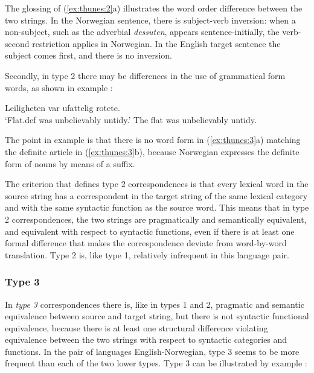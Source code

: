 \documentclass[output=paper]{LSP/langsci}
\begin{document}
The glossing of (\ref{ex:thunes:2}a) illustrates the word order difference between the two strings. In the Norwegian sentence, there is subject-verb inversion: when a non-subject, such as the adverbial \textit{dessuten}, appears sentence-initially, the verb-second restriction applies in Norwegian. In the English target sentence the subject comes first, and there is no inversion.

\begin{styleTCiiiTextBodyFirstLineIndent}
Secondly, in type 2 there may be differences in the use of grammatical form words, as shown in example :
\end{styleTCiiiTextBodyFirstLineIndent}

\ea \label{ex:thunes:3}
     \ea
Leiligheten var ufattelig rotete.\\
`Flat.def was unbelievably untidy.'  
      \ex 
The flat was unbelievably untidy.
      \z
\z

The point in example  is that there is no word form in (\ref{ex:thunes:3}a) matching the definite article in (\ref{ex:thunes:3}b), because Norwegian expresses the definite form of nouns by means of a suffix.

The criterion that defines type 2 correspondences is that every lexical word in the source string has a correspondent in the target string of the same lexical category and with the same syntactic function as the source word. This means that in type 2 correspondences, the two strings are pragmatically and semantically equivalent, and equivalent with respect to syntactic functions, even if there is at least one formal difference that makes the correspondence deviate from word-by-word translation. Type 2 is, like type 1, relatively infrequent in this language pair.

\subsubsection{Type 3}\label{sec:thunes:3.1.3}

In \textit{type 3} correspondences there is, like in types 1 and 2, pragmatic and semantic equivalence between source and target string, but there is not syntactic functional equivalence, because there is at least one structural difference violating equivalence between the two strings with respect to syntactic categories and functions. In the pair of languages English-Norwegian, type 3 seems to be more frequent than each of the two lower types. Type 3 can be illustrated by example :
\end{document}
